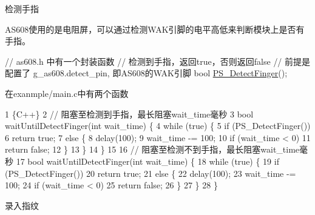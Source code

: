 检测手指

A\+S608使用的是电阻屏，可以通过检测{\ttfamily W\+A\+K}引脚的电平高低来判断模块上是否有手指。


\begin{DoxyCode}
\textcolor{comment}{// as608.h 中有一个封装函数}
\textcolor{comment}{// 检测到手指，返回true，否则返回false}
\textcolor{comment}{// 前提是配置了 g\_as608.detect\_pin,  即AS608的WAK引脚}
\textcolor{keywordtype}{bool} \hyperlink{as608_8c_afba869bff98f6cbdbfd50eebf101e9d1}{PS\_DetectFinger}();
\end{DoxyCode}


在{\ttfamily exanmple/main.\+c}中有两个函数


\begin{DoxyCode}
1 \{C++\}
2 // 阻塞至检测到手指，最长阻塞wait\_time毫秒
3 bool waitUntilDetectFinger(int wait\_time) \{
4     while (true) \{
5         if (PS\_DetectFinger())
6             return true;
7         else \{
8             delay(100);
9             wait\_time -= 100;
10             if (wait\_time < 0)
11                 return false;
12         \}
13     \}
14 \}
15 
16 // 阻塞至检测不到手指，最长阻塞wait\_time毫秒
17 bool waitUntilDetectFinger(int wait\_time) \{
18     while (true) \{
19         if (PS\_DetectFinger())
20             return true;
21         else \{
22             delay(100);
23             wait\_time -= 100;
24             if (wait\_time < 0)
25                 return false;
26         \}
27     \}
28 \}
\end{DoxyCode}


录入指纹


